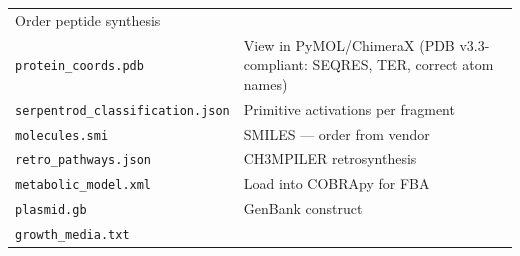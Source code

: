 \begin{longtable}[]{@{}ll@{}}
\begin{minipage}[t]{0.54\columnwidth}
Order peptide synthesis\strut
\end{minipage}\tabularnewline
\begin{minipage}[t]{0.40\columnwidth}\raggedright
\texttt{protein\_coords.pdb}\strut
\end{minipage} & \begin{minipage}[t]{0.54\columnwidth}\raggedright
View in PyMOL/ChimeraX (PDB v3.3-compliant: SEQRES, TER, correct atom
names)\strut
\end{minipage}\tabularnewline
\begin{minipage}[t]{0.40\columnwidth}\raggedright
\texttt{serpentrod\_classification.json}\strut
\end{minipage} & \begin{minipage}[t]{0.54\columnwidth}\raggedright
Primitive activations per fragment\strut
\end{minipage}\tabularnewline
\begin{minipage}[t]{0.40\columnwidth}\raggedright
\texttt{molecules.smi}\strut
\end{minipage} & \begin{minipage}[t]{0.54\columnwidth}\raggedright
SMILES --- order from vendor\strut
\end{minipage}\tabularnewline
\begin{minipage}[t]{0.40\columnwidth}\raggedright
\texttt{retro\_pathways.json}\strut
\end{minipage} & \begin{minipage}[t]{0.54\columnwidth}\raggedright
CH3MPILER retrosynthesis\strut
\end{minipage}\tabularnewline
\begin{minipage}[t]{0.40\columnwidth}\raggedright
\texttt{metabolic\_model.xml}\strut
\end{minipage} & \begin{minipage}[t]{0.54\columnwidth}\raggedright
Load into COBRApy for FBA\strut
\end{minipage}\tabularnewline
\begin{minipage}[t]{0.40\columnwidth}\raggedright
\texttt{plasmid.gb}\strut
\end{minipage} & \begin{minipage}[t]{0.54\columnwidth}\raggedright
GenBank construct\strut
\end{minipage}\tabularnewline
\begin{minipage}[t]{0.40\columnwidth}\raggedright
\texttt{growth\_media.txt}\strut
\end{minipage} & \begin{minipage}[t]{0.54\columnwidth}\raggedright

\end{minipage}
\end{longtable}
